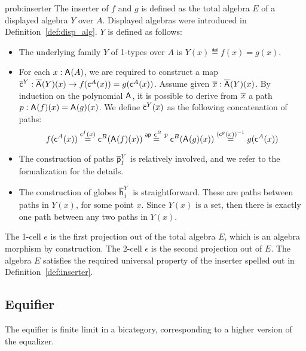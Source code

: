 \begin{construction}{prob:inserter}\label{cons:inserter}
The inserter of $f$ and $g$ is defined as the total algebra $E$ of a
displayed algebra $Y$ over $A$. Displayed algebras were
introduced in Definition~\ref{def:disp_alg}. $Y$ is defined as follows:
\begin{itemize}
\item The underlying family $Y$ of 1-types over $A$ is $Y(x) \eqdef f(x) = g(x)$.
\item
For each $x : \mathsf{A}^{}(A)$, we are required to construct
a map $\overline{\mathsf{c}}^{Y} : \overline{\mathsf{A}^{}}(Y)(x) \rightarrow
f(\mathsf{c}^{A}(x)) = g (\mathsf{c}^{A}(x))$. Assume given $\overline{x}
: \overline{\mathsf{A}^{}}(Y)(x)$. By induction on the polynomial
$\mathsf{A}^{}$, it is possible to derive from $\overline{x}$ a path $p
: \mathsf{A}^{}(f)(x) = \mathsf{A}^{}(g)(x)$.  We
define $\overline{\mathsf{c}}^{Y}(\overline{x})$ as the following concatenation of paths:
\[
f(\mathsf{c}^{A}(x))
\stackrel{\mathsf{c}^{f}(x)}{=} \mathsf{c}^{B}(\mathsf{A}^{}(f)(x))
\stackrel{\mathsf{ap} \ \mathsf{c}^{B} \ p}{=} \mathsf{c}^{B}(\mathsf{A}^{}(g)(x))
\stackrel{(\mathsf{c}^{g}(x))^{-1}}{=} g (\mathsf{c}^{A}(x))
\]
\item The construction of paths $\overline{\mathsf{p}}^{Y}_{j}$ is relatively involved, and we refer to the formalization for the details.
\item
The construction of globes $\overline{\mathsf{h}}^{Y}_{j}$ is
straightforward. These are paths between paths in $Y(x)$, for some
point $x$. Since $Y(x)$ is a set, then there is exactly one path
between any two paths in $Y(x)$.
\end{itemize}

The 1-cell $e$ is the first projection out of the total algebra $E$, which
is an algebra morphism by construction. The 2-cell $\epsilon$ is the
second projection out of $E$. The algebra $E$ satisfies the required
universal property of the inserter spelled out in Definition~\ref{def:inserter}.
\end{construction}

\subsection{Equifier}

The equifier is finite limit in a bicategory, corresponding to a
higher version of the equalizer.

